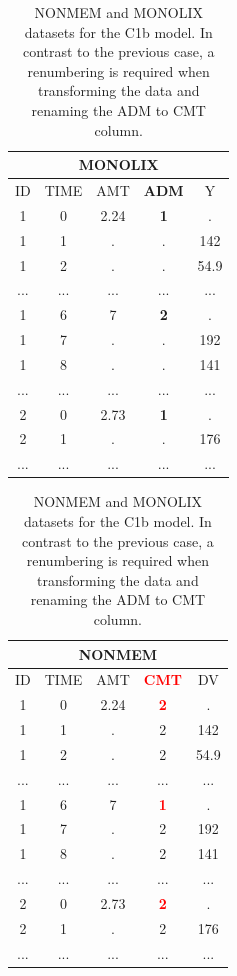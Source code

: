 \begin{table}[ht!]
\footnotesize
\parbox{.5\linewidth}{
\centering
\begin{tabular}{ccccc}
  \hline
     \multicolumn{5}{c}{\textbf{MONOLIX}} \\
  \hline
ID	& TIME  & AMT	 & \textbf{ADM} &	Y \\
  \hline
1	& 0	    & 2.24	& \textbf{1}	& . \\
1	& 1	    & .	& .		 	& 142 \\
1	& 2	    & .	& .	 		& 54.9 \\
...     &  ...     &  ...     & ...  			& ...\\
1	& 6	    & 7	& \textbf{2}	& . \\
1	& 7	    & .	& .			& 192 \\
1	& 8	    & .	& .			& 141 \\
...     &  ...     &  ...     & ...  			& ...\\
2	& 0	    & 2.73	& \textbf{1}	& . \\
2	& 1	    & . 	& .			& 176 \\
...     &  ...     &  ...     & ...  			& ...\\
\end{tabular}
}
\hfill
\parbox{.5\linewidth}{
\centering
\begin{tabular}{ccccc}
  \hline
   \multicolumn{5}{c}{\textbf{NONMEM}} \\
  \hline
ID	& TIME  & AMT	 & \textbf{\textcolor{red}{CMT}} &	DV \\
  \hline
1	& 0	    & 2.24	& \textbf{\textcolor{red}{2}}	& . \\
1	& 1	    & .	& 2		 	& 142 \\
1	& 2	    & .	& 2	 		& 54.9 \\
...     &  ...     &  ...     & ...  			& ...\\
1	& 6	    & 7	& \textbf{\textcolor{red}{1}}	& . \\
1	& 7	    & .	& 2			& 192 \\
1	& 8	    & .	& 2			& 141 \\
...     &  ...     &  ...     & ...  			& ...\\
2	& 0	    & 2.73	& \textbf{\textcolor{red}{2}}	& . \\
2	& 1	    & . 	& 2	 		& 176 \\
...     &  ...     &  ...     & ...  			& ...\\
\end{tabular}
}
\caption{NONMEM and MONOLIX datasets for the C1b model. In contrast to the previous case, a 
renumbering is required when transforming the data and renaming the ADM to CMT column.}
\label{tab:C1bTable}
\end{table}

